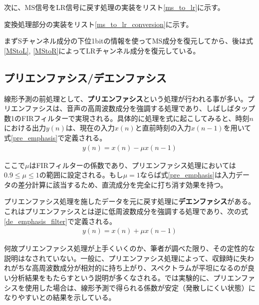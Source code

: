 \documentclass[uplatex,dvipdfmx,b5j,10pt]{jsbook}
\theoremstyle{definition}
\begin{document}
次に、MS信号をLR信号に戻す処理の実装をリスト\ref{ms_to_lr}に示す。


変換処理部分の実装をリスト\ref{ms_to_lr_conversion}に示す。


まずSチャンネル成分の下位1bitの情報を使ってMS成分を復元してから、後は式\ref{MStoL}, \ref{MStoR}によってLRチャンネル成分を復元している。

\subsection{プリエンファシス/デエンファシス}

線形予測の前処理として、\textbf{プリエンファシス}という処理が行われる事が多い\cite{digitalsoundprocess, linearpredict}。プリエンファシスは、音声の高周波数成分を強調する処理であり、しばしばタップ数1のFIRフィルターで実現される。具体的に処理を式に起こしてみると、時刻$n$における出力$y(n)$は、現在の入力$x(n)$と直前時刻の入力$x(n-1)$を用いて式\ref{pre_emphasis}で定義される。
\begin{eqnarray}
  y(n) = x(n) - \mu x(n-1) \label{pre_emphasis}
\end{eqnarray}

ここで$\mu$はFIRフィルターの係数であり、プリエンファシス処理においては$0.9 \leq \mu \leq 1$の範囲に設定される。もし$\mu=1$ならば式\ref{pre_emphasis}は入力データの差分計算に該当するため、直流成分を完全に打ち消す効果を持つ。

プリエンファシス処理を施したデータを元に戻す処理に\textbf{デエンファシス}がある。これはプリエンファシスとは逆に低周波数成分を強調する処理であり、次の式\ref{de_emphasis_filter}で定義される。
\begin{eqnarray}
  y(n) = x(n) + \mu x(n-1) \label{de_emphasis}
\end{eqnarray}

何故プリエンファシス処理が上手くいくのか、筆者が調べた限り、その定性的な説明はなされていない。一般に、プリエンファシス処理によって、収録時に失われがちな高周波数成分が相対的に持ち上がり、スペクトラムが平坦になるのが良い分析結果をもたらすという説明が多くなされる。\cite{linearpredict}では実験的に、プリエンファシスを使用した場合は、線形予測で得られる係数が安定（発散しにくい状態）になりやすいとの結果を示している。
\end{document}
